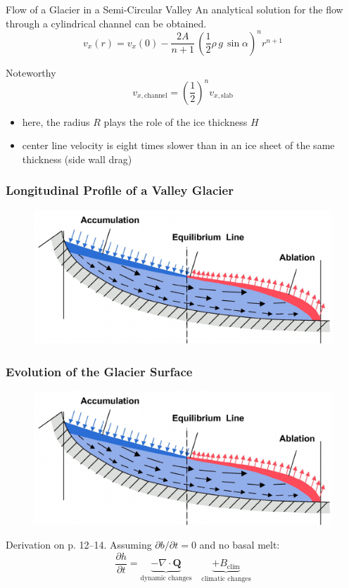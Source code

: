 \documentclass[hide notes,intlimits,unknownkeysallowed]{beamer}
\begin{document}
\begin{frame}{Flow of a Glacier in a Semi-Circular Valley}
 An analytical solution for the flow through a cylindrical channel can be obtained.
\begin{equation*}
v_x (r) = v_x (0) - \frac{2A}{n+1}\,\left( \frac{1}{2}\rho\,g\,\sin\alpha\right)^{n} r^{n+1}
\end{equation*}
\begin{block}{Noteworthy}
\begin{equation*}
v_{x, \text{channel}} = \left(\frac{1}{2}\right)^{n} v_{x, \text{slab}}
\end{equation*}
\begin{itemize}
\item here, the radius $R$ plays the role of the ice thickness $H$
\item center line velocity is \alert{eight} times slower than in an
  ice sheet of the same thickness (side wall drag)
\end{itemize}
\end{block}
\end{frame}


\begin{frame}
  \frametitle{Longitudinal Profile of a Valley Glacier}
  \begin{figure}
    \includegraphics[width=\textwidth]{flow_acc_abl}
  \end{figure}
\end{frame}

\begin{frame}
  \frametitle{Evolution of the Glacier Surface}
  \begin{figure}
    \includegraphics[width=.75\textwidth]{flow_acc_abl}
  \end{figure}
  Derivation on p. 12--14. Assuming $\partial b / \partial t = 0$ and no basal melt:
  \begin{equation*}
    \frac{\partial h}{\partial t} = \underbrace{-\nabla \cdot \mathbf{Q}}_{\text{dynamic changes}} \quad \underbrace{+B_{\text{clim}}}_{\text{climatic changes}}
  \end{equation*}
\end{frame}
\end{document}
